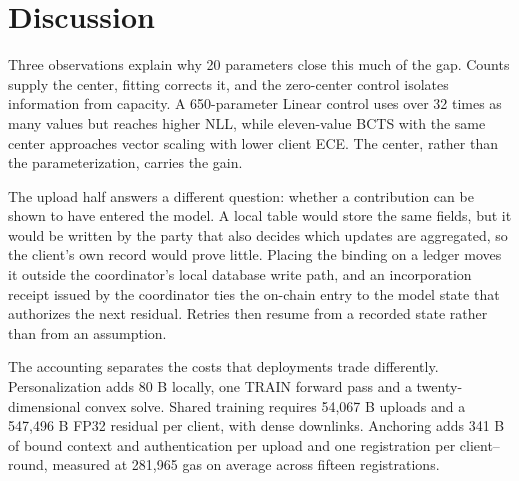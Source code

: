 \section{Discussion}
Three observations explain why 20 parameters close this much of the gap. Counts supply the center, fitting corrects it, and the zero-center control isolates information from capacity. A 650-parameter Linear control uses over 32 times as many values but reaches higher NLL, while eleven-value BCTS with the same center approaches vector scaling with lower client ECE. The center, rather than the parameterization, carries the gain.

The upload half answers a different question: whether a contribution can be shown to have entered the model. A local table would store the same fields, but it would be written by the party that also decides which updates are aggregated, so the client's own record would prove little. Placing the binding on a ledger moves it outside the coordinator's local database write path, and an incorporation receipt issued by the coordinator ties the on-chain entry to the model state that authorizes the next residual. Retries then resume from a recorded state rather than from an assumption.

The accounting separates the costs that deployments trade differently. Personalization adds 80 B locally, one TRAIN forward pass and a twenty-dimen\-sional convex solve. Shared training requires 54,067 B uploads and a 547,496 B FP32 residual per client, with dense downlinks. Anchoring adds 341 B of bound context and authentication per upload and one registration per client--round, measured at 281,965 gas on average across fifteen registrations.
